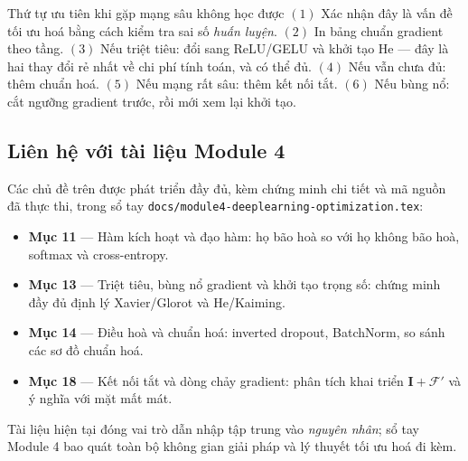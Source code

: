 \begin{guidelinebox}{Thứ tự ưu tiên khi gặp mạng sâu không học được}
$(1)$ Xác nhận đây là vấn đề tối ưu hoá bằng cách kiểm tra sai số \emph{huấn
luyện}. $(2)$ In bảng chuẩn gradient theo tầng. $(3)$ Nếu triệt tiêu: đổi sang
ReLU/GELU và khởi tạo He --- đây là hai thay đổi rẻ nhất về chi phí tính toán, và có thể đủ. $(4)$ Nếu
vẫn chưa đủ: thêm chuẩn hoá. $(5)$ Nếu mạng rất sâu: thêm kết nối tắt. $(6)$ Nếu
bùng nổ: cắt ngưỡng gradient trước, rồi mới xem lại khởi tạo.
\end{guidelinebox}

\subsection{Liên hệ với tài liệu Module 4}

Các chủ đề trên được phát triển đầy đủ, kèm chứng minh chi tiết và mã nguồn đã
thực thi, trong sổ tay \texttt{docs/module4-deeplearning-optimization.tex}:

\begin{itemize}[leftmargin=*, itemsep=2pt]
  \item \textbf{Mục 11} --- Hàm kích hoạt và đạo hàm: họ bão hoà so với họ không
    bão hoà, softmax và cross-entropy.
  \item \textbf{Mục 13} --- Triệt tiêu, bùng nổ gradient và khởi tạo trọng số:
    chứng minh đầy đủ định lý Xavier/Glorot và He/Kaiming.
  \item \textbf{Mục 14} --- Điều hoà và chuẩn hoá: inverted dropout,
    BatchNorm, so sánh các sơ đồ chuẩn hoá.
  \item \textbf{Mục 18} --- Kết nối tắt và dòng chảy gradient: phân tích khai
    triển $\mathbf{I}+\mathcal{F}'$ và ý nghĩa với mặt mất mát.
\end{itemize}

Tài liệu hiện tại đóng vai trò dẫn nhập tập trung vào \emph{nguyên nhân}; sổ tay
Module 4 bao quát toàn bộ không gian giải pháp và lý thuyết tối ưu hoá đi kèm.
